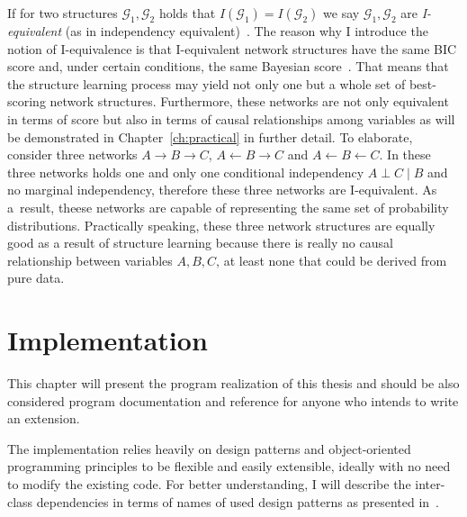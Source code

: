 \documentclass[english,cover]{fitthesis} %
\newcommand{\term}[1]{\emph{#1}}           %
\begin{document}
If for two structures $\mathcal{G}_1, \mathcal{G}_2$ holds that $I(\mathcal{G}_1) = I(\mathcal{G}_2)$ we say $\mathcal{G}_1, \mathcal{G}_2$ are \term{I-equivalent} (as in independency equivalent)~\cite[p.~76]{pgm}. The reason why I introduce the notion of I-equivalence is that I-equivalent network structures have the same BIC score and, under certain conditions, the same Bayesian score~\cite[p.~807]{pgm}. That means that the structure learning process may yield not only one but a whole set of best-scoring network structures. Furthermore, these networks are not only equivalent in terms of score but also in terms of causal relationships among variables as will be demonstrated in Chapter~\ref{ch:practical} in further detail. To elaborate, consider three networks $A \rightarrow B \rightarrow C$, $A \leftarrow B \rightarrow C$ and $A \leftarrow B \leftarrow C$. In these three networks holds one and only one conditional independency $A \perp C \mid B$ and no marginal independency, therefore these three networks are I-equivalent. As a~result, theese networks are capable of representing the same set of probability distributions. Practically speaking, these three network structures are equally good as a result of structure learning because there is really no causal relationship between variables $A,B,C$, at least none that could be derived from pure data.




























\chapter{Implementation}
This chapter will present the program realization of this thesis and should be also considered program documentation and reference for anyone who intends to write an extension.

The implementation relies heavily on design patterns and object-oriented programming principles to be flexible and easily extensible, ideally with no need to modify the existing code. For better understanding, I will describe the inter-class dependencies in terms of names of used design patterns as presented in~\cite{head_first_design_patterns}.
\end{document}
